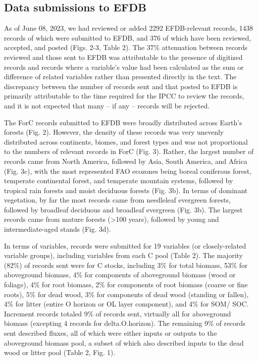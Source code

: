 \documentclass[, manuscript]{copernicus}
\begin{document}
\endgroup{}

\subsection{Data submissions to EFDB}

As of June 08, 2023, we had reviewed or added 2292 EFDB-relevant
records, 1438 records of which were submitted to EFDB, and 376 of which
have been reviewed, accepted, and posted (Figs. 2-3, Table 2). The 37\%
attenuation between records reviewed and those sent to EFDB was
attributable to the presence of digitized records and records where a
variable's value had been calculated as the sum or difference of related
variables rather than presented directly in the text. The discrepancy
between the number of records sent and that posted to EFDB is primarily
attributable to the time required for the IPCC to review the records,
and it is not expected that many -- if any -- records will be rejected.

The ForC records submitted to EFDB were broadly distributed across
Earth's forests (Fig. 2). However, the density of these records was very
unevenly distributed across continents, biomes, and forest types and was
not proportional to the numbers of relevant records in ForC (Fig. 3).
Rather, the largest number of records came from North America, followed
by Asia, South America, and Africa (Fig. 3c), with the most represented
FAO ecozones being boreal coniferous forest, temperate continental
forest, and temperate mountain systems, followed by tropical rain
forests and moist deciduous forests (Fig. 3b). In terms of dominant
vegetation, by far the most records came from needleleaf evergreen
forests, followed by broadleaf deciduous and broadleaf evergreen (Fig.
3b). The largest records came from mature forests (\textgreater100
years), followed by young and intermediate-aged stands (Fig. 3d).

In terms of variables, records were submitted for 19 variables (or
closely-related variable groups), including variables from each C pool
(Table 2). The majority (82\%) of records sent were for C stocks,
including 3\% for total biomass, 53\% for aboveground biomass, 4\% for
components of aboveground biomass (wood or foliage), 4\% for root
biomass, 2\% for components of root biomass (coarse or fine roots), 5\%
for dead wood, 3\% for components of dead wood (standing or fallen), 4\%
for litter (entire O horizon or OL layer component), and 4\% for SOM/
SOC. Increment records totaled 9\% of records sent, virtually all for
aboveground biomass (excepting 4 records for delta.O.horizon). The
remaining 9\% of records sent described fluxes, all of which were either
inputs or outputs to the aboveground biomass pool, a subset of which
also described inputs to the dead wood or litter pool (Table 2, Fig. 1).
\end{document}
